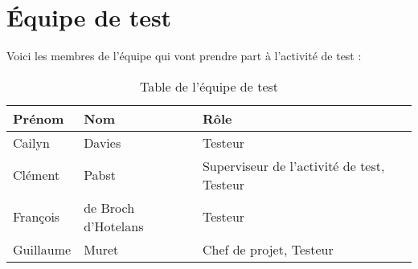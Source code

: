 
\chapter{Équipe de test}
\label{refp8}

Voici les membres de l'équipe qui vont prendre part à l'activité de test : \\

\begin{table}[!h]
\begin{center}	
\begin{tabular}{|p{}|p{}|p{7cm}|}
\hline
\textbf{Prénom} & \textbf{Nom} & \textbf{Rôle} \\
\hline
Cailyn & Davies & Testeur\\
\hline
Clément & Pabst & Superviseur de l'activité de test, Testeur\\
\hline
François & de Broch d'Hotelans & Testeur\\
\hline
Guillaume & Muret & Chef de projet, Testeur\\
\hline
\end{tabular}
\end{center}
\caption{Table de l'équipe de test}
\end{table}